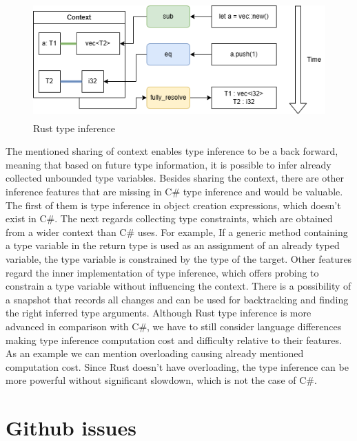 \par
\begin{figure}
\centering
\includegraphics[width=120mm, height=45mm]{./img/RustTypeInference.png}
\caption{Rust type inference}
\label{img57:rustTypeInference}
\end{figure}
\par
{}
The mentioned sharing of context enables type inference to be a back forward, meaning that based on future type information, it is possible to infer already collected unbounded type variables. 
Besides sharing the context, there are other inference features that are missing in C\# type inference and would be valuable. 
The first of them is type inference in object creation expressions, which doesn't exist in C\#. 
The next regards collecting type constraints, which are obtained from a wider context than C\# uses. 
For example, If a generic method containing a type variable in the return type is used as an assignment of an already typed variable, the type variable is constrained by the type of the target. Other features regard the inner implementation of type inference, which offers probing to constrain a type variable without influencing the context. 
There is a possibility of a snapshot that records all changes and can be used for backtracking and finding the right inferred type arguments.
Although Rust type inference is more advanced in comparison with C\#, we have to still consider language differences making type inference computation cost and difficulty relative to their features. As an example we can mention overloading causing already mentioned computation cost. 
Since Rust doesn't have overloading, the type inference can be more powerful without significant slowdown, which is not the case of C\#.

\section{Github issues}

